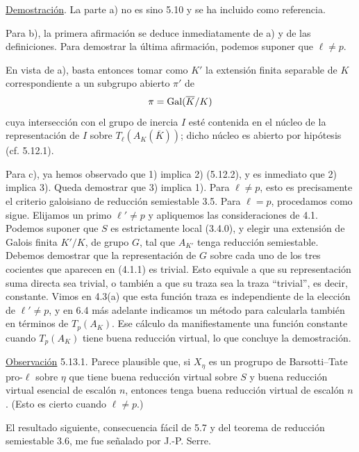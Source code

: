 \noindent
\underline{Demostración}. La parte a) no es sino 5.10 y se ha incluido
como referencia.

Para b), la primera afirmación se deduce inmediatamente de a) y de las
definiciones. Para demostrar la última afirmación, podemos suponer que
$\ell\neq p$.


En vista de a), basta entonces tomar como $K'$ la extensión finita
separable de $K$ correspondiente a un subgrupo abierto $\pi'$ de
\[
 \pi=\sisi{\operatorname{Gal}(\overline K/\overline K)}%
 {\operatorname{Gal}(\overline K/K)}
\]
cuya intersección con el grupo de inercia $I$ esté contenida en el
núcleo de la representación de $I$ sobre
$T_\ell(A_K(\overline K))$; dicho núcleo es abierto por hipótesis
(cf. 5.12.1).

Para c), ya hemos observado que 1) implica 2) (5.12.2), y es inmediato
que 2) implica 3). Queda demostrar que 3) implica 1). Para
$\ell\neq p$, esto es precisamente el criterio galoisiano de reducción
semiestable 3.5. Para $\ell=p$, procedamos como sigue. Elijamos un primo
$\ell'\neq p$ y apliquemos las consideraciones de 4.1. Podemos suponer
que $S$ es estrictamente local (3.4.0), y elegir una extensión de
Galois finita $K'/K$, de grupo $G$, tal que $A_{K'}$ tenga reducción
semiestable. Debemos demostrar que la representación de $G$ sobre cada
uno de los tres cocientes que aparecen en (4.1.1) es trivial. Esto
equivale a que su representación suma directa sea trivial, o también a
que su traza sea la traza ``trivial'', es decir, constante. Vimos en
4.3(a) que esta función traza es independiente de la elección de
$\ell'\neq p$, y en 6.4 más adelante indicamos un método para calcularla
también en términos de $T_p(A_K)$. Ese cálculo da manifiestamente una
función constante cuando $T_p(A_K)$ tiene buena reducción virtual, lo
que concluye la demostración.

\medskip
\noindent
\underline{Observación} 5.13.1. Parece plausible que, si $X_\eta$ es
un progrupo de Barsotti--Tate pro-$\ell$ sobre $\eta$ que tiene buena
reducción virtual sobre $S$ y buena reducción virtual esencial de
escalón $n$, entonces tenga buena reducción virtual de escalón $n$.
(Esto es cierto cuando $\ell\neq p$.)


El resultado siguiente, consecuencia fácil de 5.7 y del teorema de
reducción semiestable 3.6, me fue señalado por J.-P. Serre.

